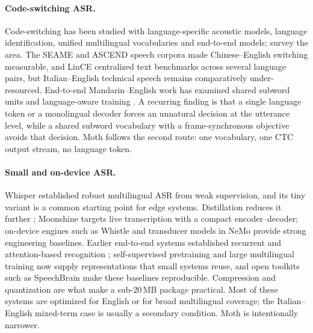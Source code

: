 \documentclass{article}
\newcommand{\moth}{Moth}
\begin{document}
\paragraph{Code-switching ASR.}
Code-switching has been studied with language-specific acoustic models, language identification,
unified multilingual vocabularies and end-to-end models; \citet{sitaram2019survey} survey the
area. The SEAME \citep{lyu2010seame} and ASCEND \citep{lovenia2022ascend} speech corpora made
Chinese--English switching measurable, and LinCE \citep{aguilar2020lince} centralized text
benchmarks across several language pairs, but Italian--English technical speech remains
comparatively under-resourced. End-to-end Mandarin--English work has examined shared subword
units and language-aware training \citep{zeng2019endtoend}. A recurring finding is
that a single language token or a monolingual decoder forces an unnatural decision at the
utterance level, while a shared subword vocabulary with a frame-synchronous objective avoids
that decision. \moth{} follows the second route: one vocabulary, one CTC output stream, no
language token.

\paragraph{Small and on-device ASR.}
Whisper \citep{radford2023whisper} established robust multilingual ASR from weak supervision, and
its tiny variant is a common starting point for edge systems. Distillation reduces it further \citep{gandhi2023distilwhisper}; Moonshine \citep{jeffries2024moonshine} targets live
transcription with a compact encoder--decoder; on-device engines such as Whistle
\citep{cactus2024whistle} and transducer models in NeMo \citep{nemo2024} provide strong
engineering baselines. Earlier end-to-end systems established recurrent and attention-based
recognition \citep{amodei2016deepspeech2,chan2016las,chiu2018sota}; self-supervised pretraining
\citep{hsu2021hubert} and large multilingual training \citep{zhang2023usm,pratap2023mms} now
supply representations that small systems reuse, and open toolkits such as SpeechBrain
\citep{ravanelli2021speechbrain} make these baselines reproducible. Compression and quantization
\citep{han2016deepcompression,jacob2018quantization,krishnamoorthi2018quantizing} are what make a
sub-20\,MB package practical. Most of these systems are optimized for English or for
broad multilingual coverage; the Italian--English mixed-term case is usually a secondary
condition. \moth{} is intentionally narrower.
\end{document}
